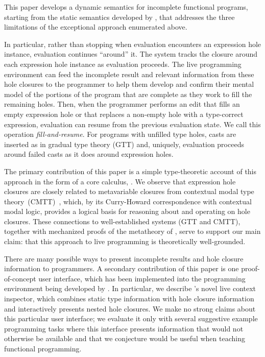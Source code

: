 
This paper develops a dynamic semantics for incomplete functional programs, starting from the static semantics developed by \citet{popl-paper},  that addresses the three limitations of the exceptional approach enumerated above.

In particular, rather than stopping when evaluation encounters an expression hole instance, evaluation continues ``around'' it.   
The system tracks the closure around each expression hole instance as evaluation proceeds. The live programming environment can feed the incomplete result and relevant information from these {hole closures} to the programmer to help them develop and confirm their mental model of the portions of the program that are complete as they work to fill the remaining holes. 
Then, when the programmer performs an edit that fills an empty expression hole or that replaces a non-empty hole with a type-correct expression, evaluation can resume from the previous evaluation state. We call this operation \emph{fill-and-resume}. For programs with unfilled type holes, casts are inserted as in gradual type theory (GTT) \cite{DBLP:conf/snapl/SiekVCB15} and, uniquely, evaluation proceeds around failed casts as it does around expression holes. 

The primary contribution of this paper is a simple type-theoretic account of this approach in the form of a core calculus, \HazelnutLive. We observe that expression hole closures are closely related to metavariable closures from contextual modal type theory~(CMTT)~\cite{Nanevski2008}, which, by its Curry-Howard correspondence with contextual modal logic, provides a logical basis for reasoning about and operating on hole closures. These connections to well-established systems (GTT and CMTT), together with mechanized proofs of the metatheory of \HazelnutLive, serve to support our main claim: that this approach to live programming is theoretically well-grounded.

There are many possible ways to present incomplete results and hole closure information to programmers. A secondary contribution of this paper is one  proof-of-concept user interface, which has been implemented into the \Hazel programming environment being developed by \citet{HazelnutSNAPL}. In particular, we describe \Hazel's novel live context inspector, which  combines static type information with hole closure information and interactively presents nested hole closures. We make no strong claims about this particular user interface; we evaluate it only with several suggestive example programming tasks where this interface presents information that would not otherwise be available and that we conjecture would be useful when teaching functional programming.

